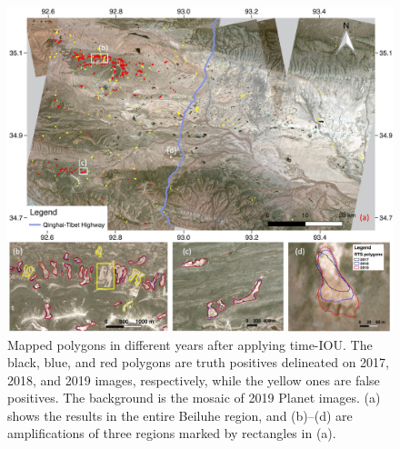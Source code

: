 \documentclass[authoryear,preprint,review,12pt]{elsarticle}
\begin{document}
\begin{figure} 
	\centering
	\includegraphics[width=14cm]{figs/multi_mapping_results_trim.jpg}
	\caption{Mapped polygons in different years after applying time-IOU. The black, blue, and red polygons are truth positives delineated on 2017, 2018, and 2019 images, respectively, while the yellow ones are false  positives. The background is the mosaic of 2019 Planet images. (a) shows the results in the entire Beiluhe region, and (b)--(d) are amplifications of three regions marked by rectangles in (a). }
	\label{fig_mapping_results}
\end{figure}
\end{document}
